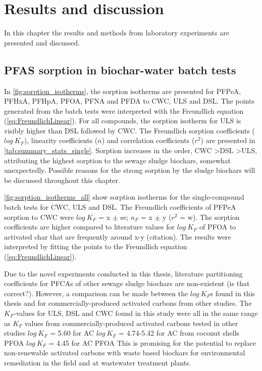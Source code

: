 \chapter{Results and discussion}\label{chap:Results&Disc}
In this chapter the results and methods from laboratory experiments are presented and discussed.

\section{PFAS sorption in biochar-water batch tests}
In \cref{fig:sorption_isotherms}, the sorption isotherms are presented for PFPeA, PFHxA, PFHpA, PFOA, PFNA and PFDA to CWC, ULS and DSL. The points generated from the batch tests were interpreted with the Freundlich equation (\cref{eq:FreundlichLinear}). For all compounds, the sorption isotherm for ULS is visibly higher than DSL followed by CWC. The Freundlich sorption coefficients ($log~K_F$), linearity coefficients ($n$) and correlation coefficients ($r^2$) are presented in \cref{tab:summary_stats_single}. Sorption increases in the order, CWC \textgreater DSL \textgreater ULS, attributing the highest sorption to the sewage sludge biochars, somewhat unexpectedly. Possible reasons for the strong sorption by the sludge biochars will be discussed throughout this chapter. 

\cref{fig:sorption_isotherms_all} show sorption isotherms for the single-compound batch tests for CWC, ULS and DSL.
The Freundlich coefficients of PFPeA sorption to CWC were $log~K_F$ = x $\pm$ se; $n_F$ = x $\pm$ y ($r^2$ = w). The sorption coefficients are higher compared to literature values for $log~K_F$ of PFOA to activated char that are frequently around x-y (citation). The results were interpreted by fitting the points to the Freundlich equation (\cref{eq:FreundlichLinear}). 

Due to the novel experiments conducted in this thesis, literature partitioning coefficients for PFCAs of other sewage sludge biochars are non-existent (is that correct?). However, a comparison can be made between the $log~K_F$s found in this thesis and for commercially-produced activated carbons from other studies. The $K_F$-values for ULS, DSL and CWC found in this study were all in the same range as $K_F$ values from commercially-produced activated carbons tested in other studies
\citep{Kupryianchyk2016a} $log~K_F$ = 5.60 for AC
\citep{silvani2019can} $log~K_F$ = 4.74-5.42 for AC from coconut shells PFOA
\citep{hansen2010sorption} $log~K_F$ = 4.45 for AC PFOA
This is promising for the potential to replace non-renewable activated carbons with waste based biochars for environmental remediation in the field and at wastewater treatment plants. 

